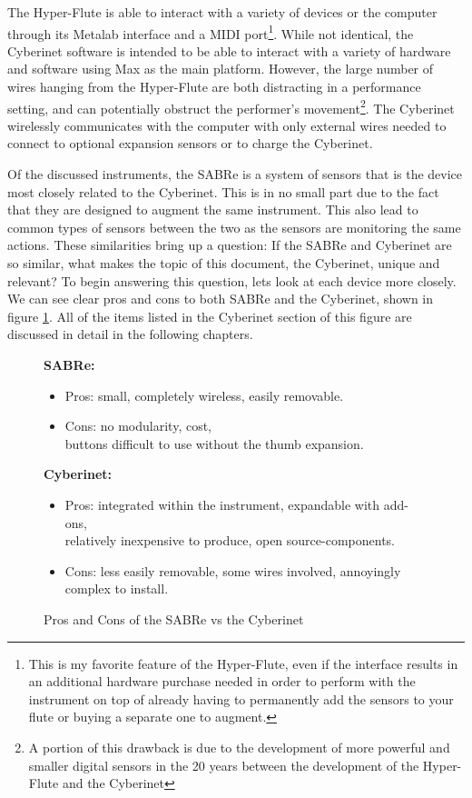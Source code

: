 The Hyper-Flute is able to interact with a variety of devices or the computer through its Metalab interface and a MIDI port\footnote{This is my favorite feature of the Hyper-Flute, even if the interface results in an additional hardware purchase needed in order to perform with the instrument on top of already having to permanently add the sensors to your flute or buying a separate one to augment.}. While not identical, the Cyberinet software is intended to be able to interact with a variety of hardware and software using Max as the main platform. However, the large number of wires hanging from the Hyper-Flute are both distracting in a performance setting, and can potentially obstruct the performer's movement\footnote{A portion of this drawback is due to the development of more powerful and smaller digital sensors in the 20 years between the development of the Hyper-Flute and the Cyberinet}. The Cyberinet wirelessly communicates with the computer with only external wires needed to connect to optional expansion sensors or to charge the Cyberinet.


Of the discussed instruments, the SABRe is a system of sensors that is the device most closely related to the Cyberinet. This is in no small part due to the fact that they are designed to augment the same instrument. This also lead to common types of sensors between the two as the sensors are monitoring the same actions. These similarities bring up a question: If the SABRe and Cyberinet are so similar, what makes the topic of this document, the Cyberinet, unique and relevant? To begin answering this question, lets look at each device more closely. We can see clear pros and cons to both SABRe and the Cyberinet, shown in figure \ref{fig:proCon_SABRe_Cyberinet}. All of the items listed in the Cyberinet section of this figure are discussed in detail in the following chapters.

\begin{figure}
    \centering
   \textbf{SABRe:}

\begin{itemize}
    \item Pros: small, completely wireless, easily removable.
    \item Cons: no modularity, cost, \\buttons difficult to use without the thumb expansion.
\end{itemize}

\textbf{Cyberinet:} 

\begin{itemize}
    \item Pros: integrated within the instrument, expandable with add-ons,\\ relatively inexpensive to produce, open source-components.
    \item Cons: less easily removable, some wires involved, annoyingly complex to install.
\end{itemize}
    \caption{Pros and Cons of the SABRe vs the Cyberinet}
    \label{fig:proCon_SABRe_Cyberinet}
\end{figure}

